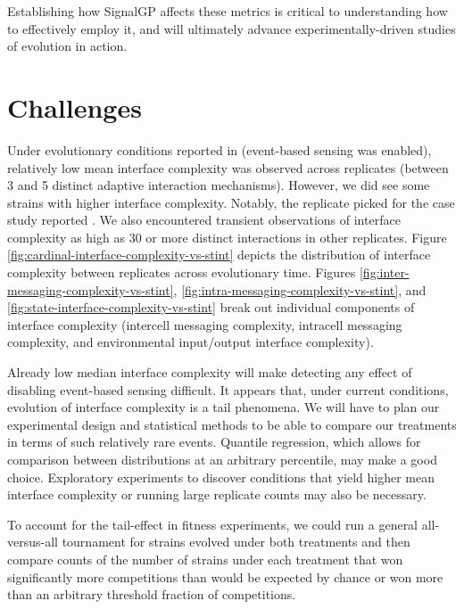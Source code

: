 Establishing how SignalGP affects these metrics is critical to understanding how to effectively employ it, and will ultimately advance experimentally-driven studies of evolution in action.

\section{Challenges}






Under evolutionary conditions reported in \citep{moreno2021case} (event-based sensing was enabled), relatively low mean interface complexity was observed across replicates (between 3 and 5 distinct adaptive interaction mechanisms).
However, we did see some strains with higher interface complexity.
Notably, the replicate picked for the case study reported \citep{moreno2021case} .
We also encountered transient observations of interface complexity as high as 30 or more distinct interactions in other replicates.
Figure \ref{fig:cardinal-interface-complexity-vs-stint} depicts the distribution of interface complexity between replicates across evolutionary time.
Figures \ref{fig:inter-messaging-complexity-vs-stint}, \ref{fig:intra-messaging-complexity-vs-stint}, and \ref{fig:state-interface-complexity-vs-stint} break out individual components of interface complexity (intercell messaging complexity, intracell messaging complexity, and environmental input/output interface complexity).

Already low median interface complexity will make detecting any effect of disabling event-based sensing difficult.
It appears that, under current conditions, evolution of interface complexity is a tail phenomena.
We will have to plan our experimental design and statistical methods to be able to compare our treatments in terms of such relatively rare events.
Quantile regression, which allows for comparison between distributions at an arbitrary percentile, may make a good choice.
Exploratory experiments to discover conditions that yield higher mean interface complexity or running large replicate counts may also be necessary.

To account for the tail-effect in fitness experiments, we could run a general all-versus-all tournament for strains evolved under both treatments and then compare counts of the number of strains under each treatment that won significantly more competitions than would be expected by chance or won more than an arbitrary threshold fraction of competitions.

